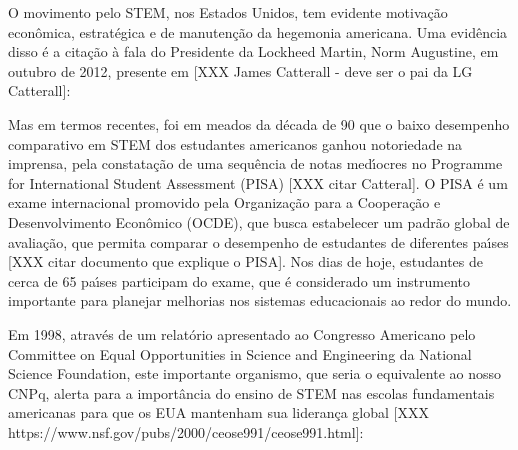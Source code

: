 \documentclass[
12pt,		%
openright,	%
twoside,  %
a4paper,			%
chapter=TITLE,		%
english,			%
french,				%
spanish,			%
brazil				%
]{USPSC-classe/USPSC}
\begin{document}
O movimento pelo STEM, nos Estados Unidos, tem evidente motiva\c{c}\~ao econ\^omica, estrat\'egica e de manuten\c{c}\~ao da hegemonia americana. Uma evid\^encia disso \'e a cita\c{c}\~ao \`a fala do Presidente da Lockheed Martin, Norm Augustine, em outubro de 2012, presente em [XXX James Catterall - deve ser o pai da LG Catterall]:















\noindent\begin{center}\mbox{\centering{}}\end{center}


Mas em termos recentes, foi em meados da d\'ecada de 90 que o baixo desempenho comparativo em STEM dos estudantes americanos ganhou notoriedade na imprensa, pela constata\c{c}\~ao de uma sequ\^encia de notas med\'{\i}ocres no Programme for International Student Assessment (PISA) [XXX citar Catteral]. O PISA \'e um exame internacional promovido pela Organiza\c{c}\~ao para a Coopera\c{c}\~ao e Desenvolvimento Econ\^omico (OCDE), que busca estabelecer um padr\~ao global de avalia\c{c}\~ao, que permita comparar o desempenho de estudantes de diferentes pa\'{\i}ses [XXX citar documento que explique o PISA]. Nos dias de hoje, estudantes de cerca de 65 pa\'{\i}ses participam do exame, que \'e considerado um instrumento importante para planejar melhorias nos sistemas educacionais ao redor do mundo.














Em 1998, atrav\'es de um relat\'orio apresentado ao Congresso Americano pelo Committee on Equal Opportunities in Science and Engineering da National Science Foundation, este importante organismo, que seria o equivalente ao nosso CNPq, alerta para a import\^ancia do ensino de STEM nas escolas fundamentais americanas para que os EUA mantenham sua lideran\c{c}a global [XXX https://www.nsf.gov/pubs/2000/ceose991/ceose991.html]:
\end{document}

